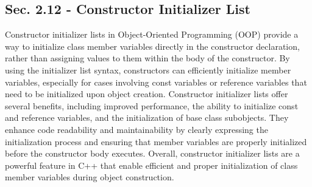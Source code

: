 \subsection*{Sec. 2.12 - Constructor Initializer List}

Constructor initializer lists in Object-Oriented Programming (OOP) provide a way to initialize class member variables directly in the constructor declaration, rather than assigning values to them within the body of the constructor. By using the initializer list syntax, constructors can efficiently 
initialize member variables, especially for cases involving const variables or reference variables that need to be initialized upon object creation. Constructor initializer lists offer several benefits, including improved performance, the ability to initialize const and reference variables, and the 
initialization of base class subobjects. They enhance code readability and maintainability by clearly expressing the initialization process and ensuring that member variables are properly initialized before the constructor body executes. Overall, constructor initializer lists are a powerful feature 
in C++ that enable efficient and proper initialization of class member variables during object construction.

